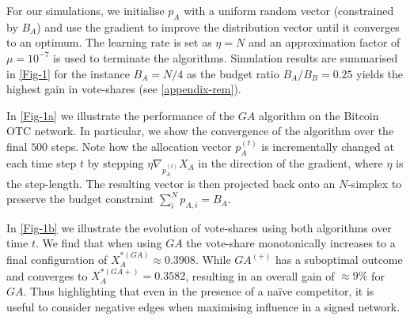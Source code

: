 For our simulations, we initialise $p_{A}$ with a uniform random vector (constrained by $B_{A}$) and use the gradient to improve the distribution vector until it converges to an optimum. The learning rate is set as $\eta=N$ and 
an approximation factor of $\mu = 10^{-7}$ is used to terminate the algorithms. 
Simulation results are summarised in \cref{Fig-1} for the instance $B_{A} = N/4$ as the budget ratio $B_{A}/B_{B}=0.25$ yields the highest gain in vote-shares (see \cref{appendix-rem}).

In \cref{Fig-1a} we illustrate the performance of the $GA$ algorithm on the Bitcoin OTC network. In particular, we show the convergence of the algorithm over the final $500$ steps. Note how the allocation vector $p_{A}^{(t)}$ is incrementally changed at each time step $t$ by stepping $\eta\nabla_{p_{A}^{(t)}}X_{A}$ in the direction of the gradient, where $\eta$ is the step-length. The resulting vector is then projected back onto an $N$-simplex to preserve the budget constraint $\sum_{i}^{N} p_{A,i} = B_{A}$.  

In \cref{Fig-1b} we illustrate the evolution of vote-shares using both algorithms over time $t$. We find that when using $GA$ the vote-share monotonically increases to a final configuration of $X_{A}^{*(GA)} \approx 0.3908$. While $GA^{(+)}$ has a suboptimal outcome and converges to $X_{A}^{*(GA+)} = 0.3582$, resulting in an overall gain of $\approx 9\%$ for $GA$. Thus highlighting that even in the presence of a naïve competitor, it is useful to consider negative edges when maximising influence in a signed network.


